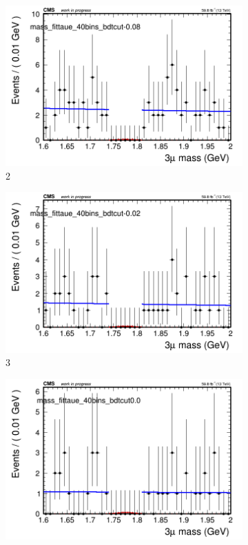 \begin{figure}[h!]
\begin{subfigure}{0.2\textwidth}
        \includegraphics[width=\textwidth]{power_law/plots/taue/massfit_taue_40bins_bdtcut-0.08.png}
        \caption{2}
    \end{subfigure}
    \begin{subfigure}{0.2\textwidth}
        \includegraphics[width=\textwidth]{power_law/plots/taue/massfit_taue_40bins_bdtcut-0.02.png}
        \caption{3}
    \end{subfigure}
    \begin{subfigure}{0.2\textwidth}
        \includegraphics[width=\textwidth]{power_law/plots/taue/massfit_taue_40bins_bdtcut0.0.png}

\end{subfigure}
\end{figure}
